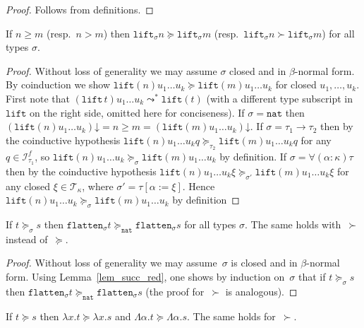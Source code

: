 \documentclass[a4paper,UKenglish,cleveref,autoref,numberwithinsect]{lipics-v2019}
\theoremstyle{definition}
\newcommand{\Iterms}{\mathcal{I}}
\newcommand{\arrtype}{\rightarrow}
\newcommand{\subst}[2]{#1:=#2}
\newcommand{\abs}[2]{\lambda #1.#2}
\newcommand{\tabs}[2]{\Lambda #1.#2}
\newcommand{\nat}{\mathtt{nat}}
\newcommand{\flatten}{\mathtt{flatten}}
\newcommand{\lift}{\mathtt{lift}}
\newcommand{\Tc}{\mathcal{T}}
\newcommand{\da}{\mathord{\downarrow}}
\begin{document}
\begin{proof}
  Follows from definitions.
\end{proof}

\begin{lemma}\label{lem:liftgreater}
  If $n \geq m$ (resp.~$n > m$) then $\lift_\sigma n \succeq
  \lift_\sigma m$ (resp.~$\lift_\sigma n \succ \lift_\sigma m$) for
  all types $\sigma$.
\end{lemma}

\begin{proof}
  Without loss of generality we may assume $\sigma$ closed and in
  $\beta$-normal form. By coinduction we show $\lift(n) u_1 \ldots u_k
  \succeq \lift(m) u_1 \ldots u_k$ for closed $u_1,\ldots,u_k$. First
  note that $(\lift\,t) u_1 \ldots u_k \leadsto^* \lift(t)$ (with a
  different type subscript in~$\lift$ on the right side, omitted here
  for conciseness). If $\sigma = \nat$ then $(\lift(n) u_1 \ldots
  u_k)\da = n \ge m = (\lift(m) u_1 \ldots u_k)\da$. If $\sigma =
  \tau_1\arrtype\tau_2$ then by the coinductive hypothesis $\lift(n)
  u_1 \ldots u_k q \succeq_{\tau_2} \lift(m) u_1 \ldots u_k q$ for any
  $q \in \Iterms^f_{\tau_1}$, so $\lift(n) u_1 \ldots u_k
  \succeq_{\sigma} \lift(m) u_1 \ldots u_k$ by definition. If $\sigma
  = \forall(\alpha:\kappa)\tau$ then by the coinductive hypothesis
  $\lift(n) u_1 \ldots u_k \xi \succeq_{\sigma'} \lift(m) u_1 \ldots
  u_k \xi$ for any closed $\xi \in \Tc_\kappa$, where $\sigma' =
  \tau[\subst{\alpha}{\xi}]$. Hence $\lift(n) u_1 \ldots u_k
  \succeq_{\sigma} \lift(m) u_1 \ldots u_k$ by definition
\end{proof}

\begin{lemma}\label{lem_flatten_succ}
  If $t \succeq_\sigma s$ then $\flatten_\sigma t \succeq_\nat
  \flatten_\sigma s$ for all types $\sigma$. The same holds
  with~$\succ$ instead of~$\succeq$.
\end{lemma}

\begin{proof}
  Without loss of generality we may assume~$\sigma$ is closed and in
  $\beta$-normal form. Using Lemma~\ref{lem_succ_red}, one shows by
  induction on~$\sigma$ that if $t \succeq_\sigma s$ then
  $\flatten_\sigma t \succeq_\nat \flatten_\sigma s$ (the proof
  for~$\succ$ is analogous).
\end{proof}

\begin{lemma}\label{lem_abs_succ}
  If $t \succeq s$ then $\abs{x}{t} \succeq \abs{x}{s}$ and
  $\tabs{\alpha}{t} \succeq \tabs{\alpha}{s}$. The same holds
  for~$\succ$.
\end{lemma}
\end{document}
